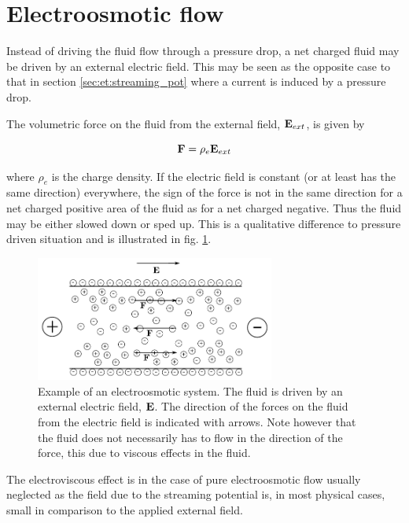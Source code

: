 \section{Electroosmotic flow}\label{sec:et:electroosmosis}
Instead of driving the fluid flow through a pressure drop, a net
charged fluid may be driven by an external electric field. This may
be seen as the opposite case to that in section
\ref{sec:et:streaming_pot} where a current is induced by a pressure
drop.

The volumetric force on the fluid from the external field, $\mathbf{E}_{ext}$,
is given by

\begin{equation}
\mathbf{F} = \mathrm{\rho}_e \mathbf{E}_{ext}
\end{equation}

where $\rho_e$ is the charge density. If the electric field is
constant (or at least has the same direction) everywhere, the sign of
the force is not in the same direction for a net charged positive area
of the fluid as for a net charged negative. Thus the fluid may be
either slowed down or sped up. This is a qualitative difference to
pressure driven situation and is illustrated in fig. \ref{fig:et:eo}.

\begin{figure}
\begin{center}
\includegraphics[width=0.7\textwidth]{fig/channel_electroosmosis.pdf}
\end{center}
\caption{Example of an electroosmotic system. The fluid is driven by an
  external electric field, $\mathbf{E}$. The direction of the forces on the fluid
  from the electric field is indicated with arrows. Note however that
  the fluid does not necessarily has to flow in the direction of the
  force, this due to viscous effects in the fluid. }
\label{fig:et:eo}
\end{figure}

The electroviscous effect is in the case of pure electroosmotic flow
usually neglected as the field due to the streaming potential is, in
most physical cases, small in comparison to the applied external
field. \cite{dongquing-ren}
